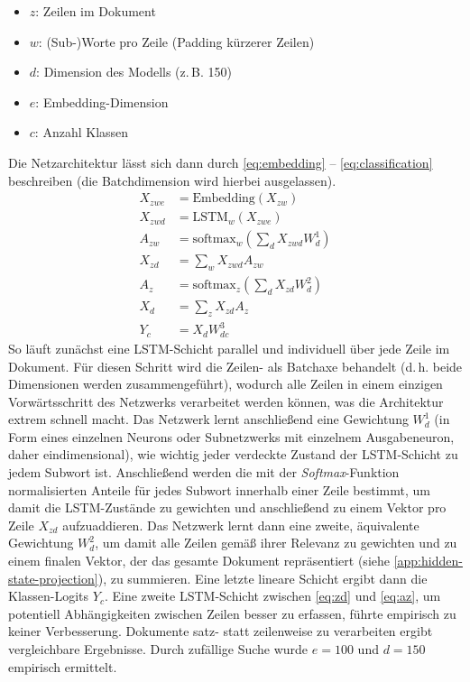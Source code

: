 \documentclass[bachelor,german]{info1thesis}
\begin{document}
%
\begin{itemize}
\itemsep-.5em
\item $z$: Zeilen im Dokument
\item $w$: (Sub-)Worte pro Zeile (Padding kürzerer Zeilen)
\item $d$: Dimension des Modells (z.\,B. 150)
\item $e$: Embedding-Dimension
\item $c$: Anzahl Klassen
\end{itemize}
%
Die Netzarchitektur lässt sich dann durch \autoref{eq:embedding} -- \ref{eq:classification} beschreiben (die Batchdimension wird hierbei ausgelassen).
%
\begin{align}
X_{zwe} &= \text{Embedding}(X_{zw}) \label{eq:embedding} \\
X_{zwd} &= \text{LSTM}_w(X_{zwe}) \label{eq:lstm} \\
A_{zw} &= \text{softmax}_w\left(\sum_d X_{zwd} W_{d}^1\right) \\
X_{zd} &= \sum_w X_{zwd} A_{zw} \label{eq:zd} \\
A_{z} &= \text{softmax}_z\left(\sum_d X_{zd} W_{d}^2\right) \label{eq:az} \\
X_{d} &= \sum_z X_{zd} A_z \label{eq:d} \\
Y_c &= X_d W_{dc}^3 \label{eq:classification}
\end{align}
%
So läuft zunächst eine LSTM-Schicht parallel und individuell über jede Zeile im Dokument. Für diesen Schritt wird die Zeilen- als Batchaxe behandelt (d.\,h. beide Dimensionen werden zusammengeführt), wodurch alle Zeilen in einem einzigen Vorwärtsschritt des Netzwerks verarbeitet werden können, was die Architektur extrem schnell macht. Das Netzwerk lernt anschließend eine Gewichtung $W_d^1$ (in Form eines einzelnen Neurons oder Subnetzwerks mit einzelnem Ausgabeneuron, daher eindimensional), wie wichtig jeder verdeckte Zustand der LSTM-Schicht zu jedem Subwort ist. Anschließend werden die mit der \textit{Softmax}-Funktion normalisierten Anteile für jedes Subwort innerhalb einer Zeile bestimmt, um damit die LSTM-Zustände zu gewichten und anschließend zu einem Vektor pro Zeile $X_{zd}$ aufzuaddieren. Das Netzwerk lernt dann eine zweite, äquivalente Gewichtung $W_d^2$, um damit alle Zeilen gemäß ihrer Relevanz zu gewichten und zu einem finalen Vektor, der das gesamte Dokument repräsentiert (siehe \autoref{app:hidden-state-projection}), zu summieren. Eine letzte lineare Schicht ergibt dann die Klassen-Logits $Y_c$.
Eine zweite LSTM-Schicht zwischen \autoref{eq:zd} und \ref{eq:az}, um potentiell Abhängigkeiten zwischen Zeilen besser zu erfassen, führte empirisch zu keiner Verbesserung. Dokumente satz- statt zeilenweise zu verarbeiten ergibt vergleichbare Ergebnisse. Durch zufällige Suche wurde $e = 100$ und $d = 150$ empirisch ermittelt. \\
\end{document}
